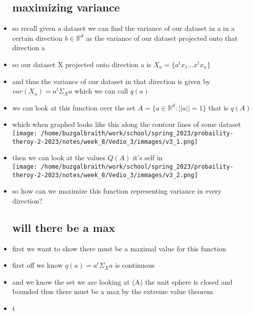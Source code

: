 \documentclass{article}
\begin{document}
\begin{itemize}
\subsection*{maximizing variance}
\item so recall given a dataset we can find the variance of our dataset in a 
 in a certain direction $b\in \mathbb{R}^{d}$ as the variance of our dataset projected
 onto that direction a
\item so our dataset X projected onto direction a is $X_{a}=\{a^tx_1...x^tx_n\}$
\item and thus the variance of our dataset in that direction is given by $var(X_a)=a^t\Sigma_{X}a$ 
which we can call $q(a)$
\item we can look at this function over the set $A=\{a\in \mathbb{R}^{d}:||a||=1\}$ that is $q(A)$
\item which when graphed looks like this along the contour lines of some dataset  \\ \texttt{[image: /home/buzgalbraith/work/school/spring\_2023/probaility-theroy-2-2023/notes/week\_8/Vedio\_3/immages/v3\_1.png]}
\item then we can look at the values $Q(A)$ it's self in  \\ \texttt{[image: /home/buzgalbraith/work/school/spring\_2023/probaility-theroy-2-2023/notes/week\_8/Vedio\_3/immages/v3\_2.png]}
\item so how can we maximize this function representing variance in every direction?
\subsection*{will there be a max}
\item first we want to show there must be a maximal value for this function
\item first off we know $q(a)=a^t\Sigma_{X}a$ is continuous 
\item  and we know the set we are looking at (A) the unit sphere is closed and bounded thus there must be a max by the extreme value theorem
\item t

\end{itemize}
\end{document}

